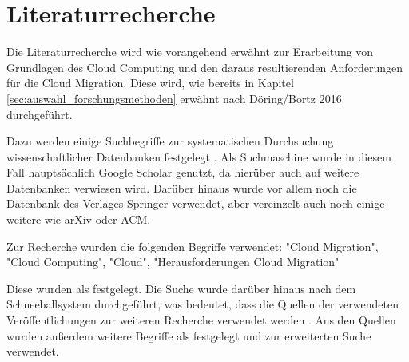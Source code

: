 \section{Literaturrecherche}

Die Literaturrecherche wird wie vorangehend erwähnt zur Erarbeitung von Grundlagen des Cloud Computing und
den daraus resultierenden Anforderungen für die Cloud Migration.
Diese wird, wie bereits in Kapitel \ref{sec:auswahl_forschungsmethoden} erwähnt nach Döring/Bortz 2016 durchgeführt.

Dazu werden einige Suchbegriffe zur systematischen Durchsuchung wissenschaftlicher Datenbanken festgelegt \cite[Vgl.][S. 158]{Doering2016}.
Als Suchmaschine wurde in diesem Fall hauptsächlich Google Scholar genutzt, da hierüber auch auf weitere Datenbanken
verwiesen wird. Darüber hinaus wurde vor allem noch die Datenbank des Verlages Springer verwendet, aber vereinzelt
auch noch einige weitere wie arXiv oder ACM.

Zur Recherche wurden die folgenden Begriffe verwendet: "Cloud Migration", "Cloud Computing", "Cloud", "Herausforderungen Cloud Migration"

Diese wurden als \textbf{\grqq{}} \cite[S. 158]{Doering2016} festgelegt. Die Suche wurde darüber hinaus
nach dem Schneeballsystem durchgeführt, was bedeutet, dass die Quellen der verwendeten Veröffentlichungen zur weiteren
Recherche verwendet werden \cite[Vgl.][S. 160]{Doering2016}. Aus den Quellen wurden außerdem weitere Begriffe als
\textbf{\grqq{}} \cite[S. 158]{Doering2016} festgelegt und zur erweiterten Suche verwendet.